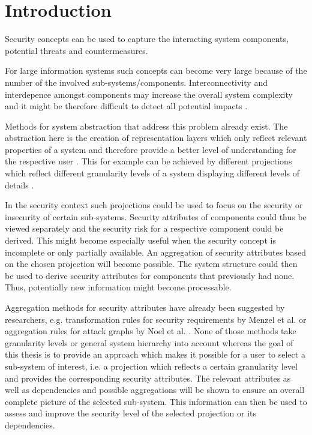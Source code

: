 \section{Introduction}

Security concepts can be used to capture the interacting system components, potential threats and countermeasures. 

For large information systems such concepts can become very large because of the number of the involved sub-systems/components. Interconnectivity and interdepence amongst components may increase the overall system complexity and it might be therefore difficult to detect all potential impacts \cite{branagan}.

Methods for system abstraction that address this problem already exist. The abstraction here is the creation of representation layers which only reflect relevant properties of a system and therefore provide a better level of understanding for the respective user \cite{pohl}. This for example can be achieved by different projections which reflect different granularity levels of a system displaying different levels of details \cite{thyssen2010system}.

In the security context such projections could be used to focus on the security or insecurity of certain sub-systems. Security attributes of components could thus be viewed separately and the security risk for a respective component could be derived. This might become especially useful when the security concept is incomplete or only partially available. An aggregation of security attributes based on the chosen projection will become possible. The system structure could then be used to derive security attributes for components that previously had none. Thus, potentially new information might become processable.

Aggregation methods for security attributes have already been suggested by researchers, e.g. transformation rules for security requirements by Menzel et al. \cite{Menzel2008} or aggregation rules for attack graphs by Noel et al. \cite{Noel:2004:MAG:1029208.1029225}. None of those methods take granularity levels or general system hierarchy into account whereas the goal of this thesis is to provide an approach which makes it possible for a user to select a sub-system of interest, i.e. a projection which reflects a certain granularity level and provides the corresponding security attributes. The relevant attributes as well as dependencies and possible aggregations will be shown to ensure an overall complete picture of the selected sub-system. This information can then be used to assess and improve the security level of the selected projection or its dependencies.